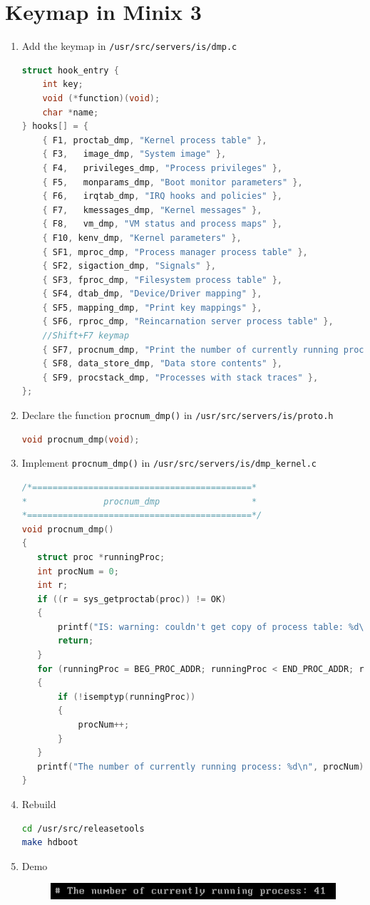 \documentclass[a4paper]{article}
\begin{document}
\section*{Keymap in Minix 3}
	\begin{enumerate}
		\item Add the keymap in \texttt{/usr/src/servers/is/dmp.c}
		\begin{lstlisting}[language=C]
struct hook_entry {
	int key;
	void (*function)(void);
	char *name;
} hooks[] = {
	{ F1, proctab_dmp, "Kernel process table" },
	{ F3,	image_dmp, "System image" },
	{ F4,	privileges_dmp, "Process privileges" },
	{ F5,	monparams_dmp, "Boot monitor parameters" },
	{ F6,	irqtab_dmp, "IRQ hooks and policies" },
	{ F7,	kmessages_dmp, "Kernel messages" },
	{ F8,	vm_dmp, "VM status and process maps" },
	{ F10, kenv_dmp, "Kernel parameters" },
	{ SF1, mproc_dmp, "Process manager process table" },
	{ SF2, sigaction_dmp, "Signals" },
	{ SF3, fproc_dmp, "Filesystem process table" },
	{ SF4, dtab_dmp, "Device/Driver mapping" },
	{ SF5, mapping_dmp, "Print key mappings" },
	{ SF6, rproc_dmp, "Reincarnation server process table" },
	//Shift+F7 keymap
	{ SF7, procnum_dmp, "Print the number of currently running process"},
	{ SF8, data_store_dmp, "Data store contents" },
	{ SF9, procstack_dmp, "Processes with stack traces" },
};
		\end{lstlisting}
		\item Declare the function \texttt{procnum\_dmp()} in \texttt{/usr/src/servers/is/proto.h}
		\begin{lstlisting}[language=C]
void procnum_dmp(void);
		\end{lstlisting}
		\item Implement \texttt{procnum\_dmp()} in \texttt{/usr/src/servers/is/dmp\_kernel.c}
		\begin{lstlisting}[language=C]
/*===========================================*
*				procnum_dmp				     *
*============================================*/
void procnum_dmp()
{
   struct proc *runningProc;
   int procNum = 0;
   int r;
   if ((r = sys_getproctab(proc)) != OK)
   {
       printf("IS: warning: couldn't get copy of process table: %d\n", r);
  	   return;
   }
   for (runningProc = BEG_PROC_ADDR; runningProc < END_PROC_ADDR; runningProc++)
   {
       if (!isemptyp(runningProc))
       {
           procNum++;
       }
   }
   printf("The number of currently running process: %d\n", procNum);
}
		\end{lstlisting}
		\item Rebuild
		\begin{lstlisting}[language=bash]
cd /usr/src/releasetools
make hdboot
		\end{lstlisting}
		\item Demo
		\begin{figure}[ht]
			\centering
			\includegraphics[scale=0.7]{demo.png}
		\end{figure}
	\end{enumerate}
\end{document}
